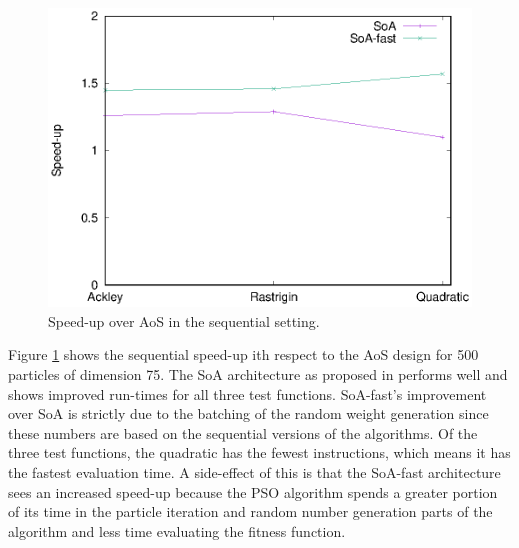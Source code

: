\begin{figure}
  \includegraphics[width=\columnwidth]{../img/output/speedup_seq}
  \caption{Speed-up over AoS in the sequential setting.}\label{fig:seq-baseline}
\end{figure}

% 
% 

Figure \ref{fig:seq-baseline} shows the sequential speed-up ith respect to the
AoS design for 500 particles of dimension 75. The SoA architecture as proposed
in \cite{cache-pso} performs well and shows improved run-times for all three test
functions. SoA-fast's improvement over SoA is strictly due to the
batching of the random weight generation since these numbers are based on the
sequential versions of the algorithms. Of the three test functions, the
quadratic has the fewest instructions, which means it has the fastest evaluation
time. A side-effect of this is that the SoA-fast architecture sees an
increased speed-up because the PSO algorithm spends a greater portion of its
time in the particle iteration and random number generation parts of the
algorithm and less time evaluating the fitness function.




